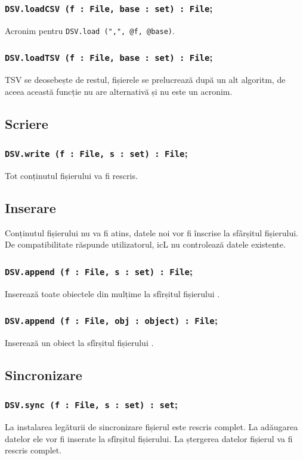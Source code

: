 \subsubsection{\lstinline|DSV.loadCSV (f : File, base : set) : File|;}

Acronim pentru \lstinline|DSV.load (",", @f, @base)|.

\subsubsection{\lstinline|DSV.loadTSV (f : File, base : set) : File|;}

TSV se deosebește de restul, fișierele se prelucrează după un alt algoritm, de aceea această funcție nu are alternativă și nu este un acronim.

\subsection{Scriere}

\subsubsection{\lstinline|DSV.write (f : File, s : set) : File|;}

Tot conținutul fișierului va fi rescris.

\subsection{Inserare}

Conținutul fișierului nu va fi atins, datele noi vor fi înscrise la sfârșitul fișierului. De compatibilitate răspunde utilizatorul, icL nu controlează datele existente.

\subsubsection{\lstinline|DSV.append (f : File, s : set) : File|;}

Inserează toate obiectele din mulțime la sfîrșitul fișierului .

\subsubsection{\lstinline|DSV.append (f : File, obj : object) : File|;}

Inserează un obiect la sfîrșitul fișierului .

\subsection{Sincronizare}

\subsubsection{\lstinline|DSV.sync (f : File, s : set) : set|;}

La instalarea legăturii de sincronizare fișierul este rescris complet. La adăugarea datelor ele vor fi inserate la sfîrșitul fișierului. La ștergerea datelor fișierul va fi rescris complet.

